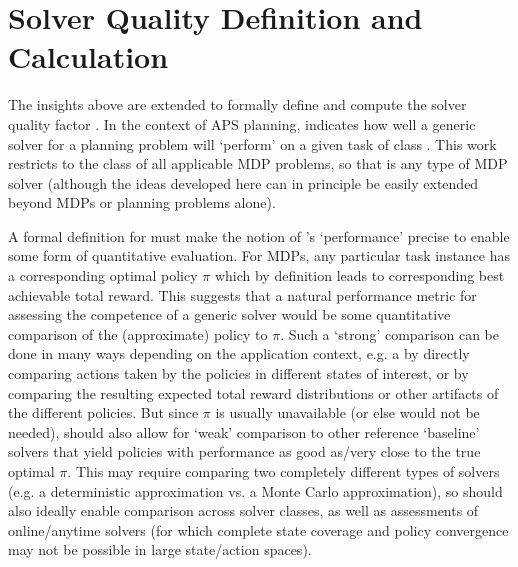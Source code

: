 \section{Solver Quality Definition and Calculation} \label{sec:SQ}


The insights above are extended to formally define and compute the solver quality \famsec{} factor \xQ{}. In the context of APS planning, \xQ{} indicates how well a generic solver \solve{} for a planning problem will `perform' on a given task \task{} of class \taskclass{}. This work restricts \taskclass{} to the class of all applicable MDP problems, so that \solve{} is any type of MDP solver  (although the ideas developed here can in principle be easily extended beyond MDPs or planning problems alone). %


A formal definition for \xQ{} must make the notion of \solve{}'s `performance' precise to enable some form of quantitative evaluation. For MDPs, any particular task instance \task{} has a corresponding optimal policy $\pi$ which by definition leads to corresponding best achievable total reward. This suggests that a natural performance metric for assessing the competence of a generic solver \solve{} would be some quantitative comparison of the (approximate) policy \tilde{\pi} to $\pi$. Such a `strong' comparison can be done in many ways depending on the application context, e.g. a by directly comparing actions taken by the policies in different states of interest, or by comparing the resulting expected total reward distributions or other artifacts of the different policies. 
But since $\pi$ is usually unavailable (or else \solve{} would not be needed), \xQ{} should also allow for `weak' comparison to other reference `baseline' solvers that yield policies with performance as good as/very close to the true optimal $\pi$. This may require comparing two completely different types of solvers (e.g. a deterministic approximation vs. a Monte Carlo approximation), so \xQ{} should also ideally enable comparison across solver classes, as well as assessments of online/anytime solvers (for which complete state coverage and policy convergence may not be possible in large state/action spaces). %

